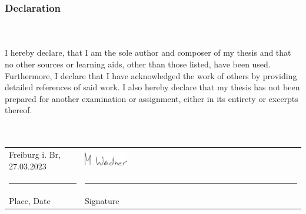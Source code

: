 \subsubsection{Declaration}\hfill\\\\
\noindent I hereby declare, that I am the sole author and composer of my thesis and that no other sources or learning aids, other than those listed, have been used. 
Furthermore, I declare that I have acknowledged the work of others by providing detailed references of said work.  \newline
I also hereby declare that my thesis has not been prepared for another examination or assignment, either in its entirety or excerpts thereof. 
\\
\\
\\
\begin{tabular}{p{} l}
  Freiburg i. Br, 27.03.2023   &   \includegraphics[width=0.2\textwidth]{signature.png} \\
  \rule{\textwidth/3}{0.4pt}   &   \rule{\textwidth/3}{0.4pt} \\
  Place, Date                  &   Signature
\end{tabular}